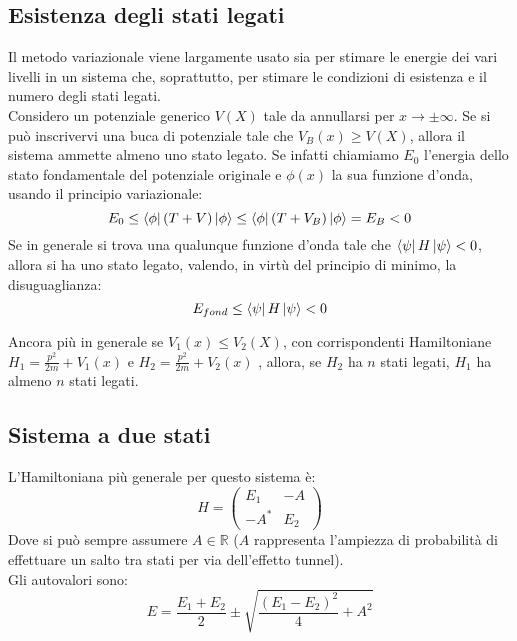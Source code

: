 \documentclass[twoside]{article}
\begin{document}
\vspace{0.5cm}

\subsection{Esistenza degli stati legati}
Il metodo variazionale viene largamente usato sia per stimare le energie dei vari livelli in un sistema che, soprattutto, per stimare le condizioni di esistenza e il numero degli stati legati.
\\
Considero un potenziale generico $V(X)$ tale da annullarsi per $x \rightarrow \pm \infty$. Se si può inscrivervi una buca di potenziale tale che $V_B (x) \geq V(X)$, allora il sistema ammette almeno uno stato legato.
Se infatti chiamiamo $E_0$ l'energia dello stato fondamentale del potenziale originale e $\phi(x)$ la sua funzione d'onda, usando il principio variazionale:
\begin{equation}
    E_0\leq \bra{\phi}(T+V)\ket{\phi}\leq\bra{\phi}(T+V_B)\ket{\phi}=E_B < 0
\end{equation}
Se in generale si trova una qualunque funzione d'onda tale che $\bra{\psi}H\ket{\psi}<0$, allora si ha uno stato legato, valendo, in virtù del principio di minimo, la disuguaglianza:
\begin{equation}
    E_{fond}\leq\bra{\psi}H\ket{\psi}<0
\end{equation}


Ancora più in generale se $V_1(x)\leq V_2(X)$, con corrispondenti Hamiltoniane $H_1=\frac{p^2}{2m}+V_1(x)$ e $H_2=\frac{p^2}{2m}+V_2(x)$ , allora, se $H_2$ ha $n$ stati legati, $H_1$ ha almeno $n$ stati legati.


\subsection{Sistema a due stati}
L'Hamiltoniana più generale per questo sistema è:
\begin{equation}
 H=   \begin{pmatrix} 
   E_1 & -A \\
   -A^* & E_2 
\end{pmatrix}
\end{equation}
Dove si può sempre assumere $A \in \mathds{R}$ ($A$ rappresenta l'ampiezza di probabilità di effettuare un salto tra stati per via dell'effetto tunnel).
\\
Gli autovalori sono:
\begin{equation} \label{6.2.2}
    E=\frac{E_1 +E_2}{2}\pm\sqrt{\frac{(E_1 - E_2)^2}{4}+A^2}
\end{equation}
\end{document}
